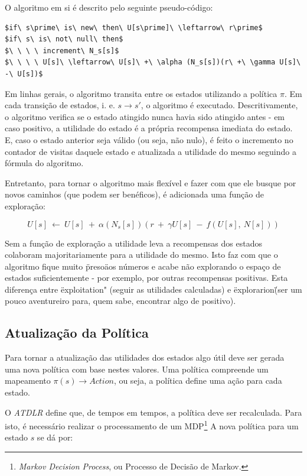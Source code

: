 \documentclass[letterpaper]{article}
\begin{document}
O algoritmo em si é descrito pelo seguinte pseudo-código:

\begin{lstlisting}
$if\ s\prime\ is\ new\ then\ U[s\prime]\ \leftarrow\ r\prime$
$if\ s\ is\ not\ null\ then$
$\ \ \ \ increment\ N_s[s]$
$\ \ \ \ U[s]\ \leftarrow\ U[s]\ +\ \alpha (N_s[s])(r\ +\ \gamma U[s]\ -\ U[s])$
\end{lstlisting}

Em linhas gerais, o algoritmo transita entre os estados utilizando a política $\pi$. Em cada
transição de estados, i. e. $s \rightarrow s\prime$, o algoritmo é executado. Descritivamente,
o algoritmo verifica se o estado atingido nunca havia sido atingido antes - em caso positivo,
a utilidade do estado é a própria recompensa imediata do estado. E, caso o estado anterior seja
válido (ou seja, não nulo), é feito o incremento no contador de visitas daquele estado e
atualizada a utilidade do mesmo seguindo a fórmula do algoritmo.

Entretanto, para tornar o algoritmo mais flexível e fazer com que ele busque por novos caminhos
(que podem ser benéficos), é adicionada uma função de exploração:

\[U[s]\ \leftarrow\ U[s]\ +\ \alpha (N_s[s])(r\ +\ \gamma U[s]\ -\ f(U[s],\ N[s]))\]

Sem a função de exploração a utilidade leva a recompensas dos estados colaboram majoritariamente
para a utilidade do mesmo. Isto faz com que o algoritmo fique muito \"preso\" aos números e acabe
não explorando o espaço de estados suficientemente - por exemplo, por outras recompensas positivas.
Esta diferença entre \"exploitation" (seguir as utilidades calculadas) e \"explorarion\" (ser um
pouco aventureiro para, quem sabe, encontrar algo de positivo).

\subsection{Atualização da Política}

Para tornar a atualização das utilidades dos estados algo útil deve ser gerada uma nova política
com base nestes valores. Uma política compreende um mapeamento $\pi(s) \rightarrow Action$, ou
seja, a política define uma ação para cada estado.

O \textit{ATDLR} define que, de tempos em tempos, a política deve ser recalculada. Para isto, é
necessário realizar o processamento de um MDP\footnote{\textit{Markov Decision Process}, ou
Processo de Decisão de Markov.} A nova política para um estado $s$ se dá por:
\end{document}
